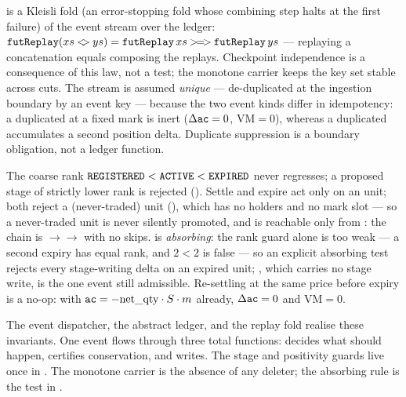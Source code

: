 \begin{invariant}
 is a Kleisli fold (an error-stopping fold whose combining step halts at the first failure) of the event stream over the ledger:
$\texttt{futReplay}(xs\mathbin{<\!\!>}ys)=\texttt{futReplay}\,xs \mathbin{>\!=\!>} \texttt{futReplay}\,ys$ ---
replaying a concatenation equals composing the replays. Checkpoint independence is a consequence of
this law, not a test; the monotone carrier keeps the key set stable across cuts. The stream is assumed
\emph{unique} --- de-duplicated at the ingestion boundary by an event key --- because the two event
kinds differ in idempotency: a duplicated  at a fixed mark is inert ($\Delta\texttt{ac}=0$,
$\mathrm{VM}=0$), whereas a duplicated  accumulates a second position delta. Duplicate
suppression is a boundary obligation, not a ledger function.
\end{invariant}

\begin{invariant}
The coarse rank $\texttt{REGISTERED}<\texttt{ACTIVE}<\texttt{EXPIRED}$ never regresses; a proposed stage of
strictly lower rank is rejected (). Settle and expire act only on an
 unit; both reject a  (never-traded) unit (), which has
no holders and no mark slot --- so a never-traded unit is never silently promoted, and 
is reachable only from : the chain is
$\to$$\to$ with no skips.  is
\emph{absorbing}: the rank guard alone is too weak --- a second expiry has equal rank, and $2<2$ is
false --- so an explicit absorbing test rejects every stage-writing delta on an expired unit;
, which carries no stage write, is the one event still admissible. Re-settling at the same
price before expiry is a no-op: with $\texttt{ac}=-\mathrm{net\_qty}\cdot S\cdot m$ already, $\Delta\texttt{ac}=0$ and
$\mathrm{VM}=0$.
\end{invariant}

The event dispatcher, the abstract ledger, and the replay fold realise these invariants. One event
flows through three total functions:  decides what should happen, 
certifies conservation, and  writes. The stage and positivity guards live once in
. The monotone carrier is the absence of any deleter; the absorbing rule is the
 test in .

